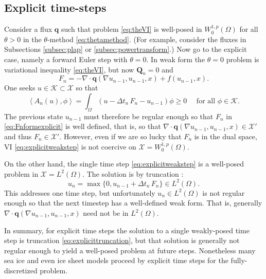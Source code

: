 \documentclass[final,onefignum]{siamart190516}
\newcommand\bq{\mathbf{q}}
\newcommand\bQ{\mathbf{Q}}
\newcommand{\Div}{\nabla\cdot}
\newcommand{\grad}{\nabla}
\newcommand{\ip}[2]{\ensuremath{\left<#1,#2\right>}}
\begin{document}
\subsection{Explicit time-steps} \label{subsec:explicit}   Consider a flux $\bq$ such that problem \eqref{eq:theVI} is well-posed in $W_0^{1,p}(\Omega)$ for all $\theta>0$ in the $\theta$-method \eqref{eq:thetamethod}.  (For example, consider the fluxes in Subsections \ref{subsec:plap} or \ref{subsec:powertransform}.)  Now go to the explicit case, namely a forward Euler step with $\theta=0$.  In weak form the $\theta=0$ problem is variational inequality \eqref{eq:theVI}, but now $\bQ_n=0$ and
\begin{equation}
F_n = - \Div \bq(\grad u_{n-1},u_{n-1},x) + f(u_{n-1},x).  \label{eq:Fnformexplicit}
\end{equation}
One seeks $u\in\mathcal{K} \subset \mathcal{X}$ so that
\begin{equation}
\ip{A_n(u)}{\phi} = \int_\Omega (u - \Delta t_n\,F_n - u_{n-1})\phi \ge 0 \quad \text{ for all } \phi \in \mathcal{K}.  \label{eq:explicitweakstep}
\end{equation}
The previous state $u_{n-1}$ must therefore be regular enough so that $F_n$ in \eqref{eq:Fnformexplicit} is well defined, that is, so that $\Div \bq(\grad u_{n-1},u_{n-1},x) \in \mathcal{X}'$ and thus $F_n\in\mathcal{X}'$.  However, even if we are so lucky that $F_n$ is in the dual space, VI \eqref{eq:explicitweakstep} is not coercive on $\mathcal{X}=W_0^{1,p}(\Omega)$.

On the other hand, the single time step \eqref{eq:explicitweakstep} is a well-posed problem in $\mathcal{X}=L^2(\Omega)$.  The solution is by truncation \cite[page 27]{KinderlehrerStampacchia1980}:
\begin{equation}
u_n = \max\{0,u_{n-1} + \Delta t_n\,F_n\} \in L^2(\Omega). \label{eq:explicittruncation}
\end{equation}
This addresses one time step, but unfortunately $u_n \in L^2(\Omega)$ is not regular enough so that the next timestep has a well-defined weak form.  That is, generally $\Div \bq(\grad u_{n-1},u_{n-1},x)$ need not be in $L^2(\Omega)$.

In summary, for explicit time steps the solution to a single weakly-posed time step is truncation \eqref{eq:explicittruncation}, but that solution is generally not regular enough to yield a well-posed problem at future steps.  Nonetheless many sea ice \cite{Thorndikeetal1975} and even ice sheet \cite{Bueleretal2005} models proceed by explicit time steps for the fully-discretized problem.
\end{document}
